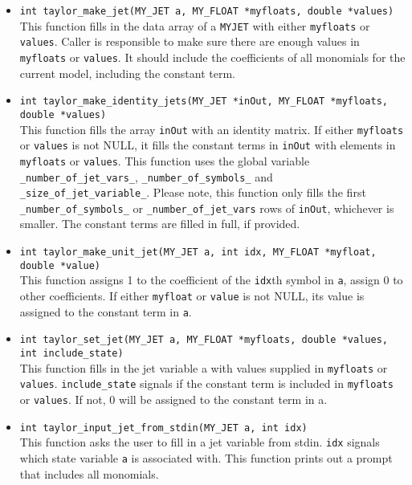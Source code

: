 \documentclass[10pt]{article}
\theoremstyle{remark}
\newcommand{\myjet}{{\tt MY\symbol{95}JET}}
\begin{document}
\begin{itemize}
\item {\verb+int taylor_make_jet(MY_JET a, MY_FLOAT *myfloats, double *values)+  \\  
    This function fills in the data array of a \myjet{} with either
    \verb+myfloats+ or \verb+values+. Caller is responsible to make
    sure there are enough values in \verb+myfloats+ or
    \verb+values+. It should include the coefficients of all monomials
    for the current model, including the constant term.}
    
\item{\verb+int taylor_make_identity_jets(MY_JET *inOut, MY_FLOAT *myfloats, double *values)+ \\
    This function fills the array \verb+inOut+ with an identity
    matrix. If either \verb+myfloats+ or \verb+values+ is not NULL, it
    fills the constant terms in \verb+inOut+ with elements in
    \verb+myfloats+ or \verb+values+.  This function uses the global
    variable \verb+_number_of_jet_vars_+, \verb+_number_of_symbols_+
    and \verb+_size_of_jet_variable_+.  Please note, this function
    only fills the first \verb+_number_of_symbols_+ or
    \verb+_number_of_jet_vars+ rows of \verb+inOut+, whichever is
    smaller. The constant terms are filled in full, if provided.}
    
\item{\verb+int taylor_make_unit_jet(MY_JET a, int idx, MY_FLOAT *myfloat, double *value)+\\
    This function assigns 1 to the coefficient of the \verb+idx+th
    symbol in \verb+a+, assign 0 to other coefficients. If either
    \verb+myfloat+ or \verb+value+ is not NULL, its value is assigned
    to the constant term in \verb+a+.  }
    
\item{\verb+int taylor_set_jet(MY_JET a, MY_FLOAT *myfloats, double *values, int include_state)+\\
    This function fills in the jet variable a with values supplied in
    \verb+myfloats+ or \verb+values+. \verb+include_state+ signals if
    the constant term is included in \verb+myfloats+ or
    \verb+values+. If not, 0 will be assigned to the constant term in
    a. }
    
\item{\verb+int taylor_input_jet_from_stdin(MY_JET a, int idx)+\\
    This function asks the user to fill in a jet variable from stdin.
    \verb+idx+ signals which state variable \verb+a+ is associated
    with.  This function prints out a prompt that includes all
    monomials.}
    

\end{itemize}
\end{document}
